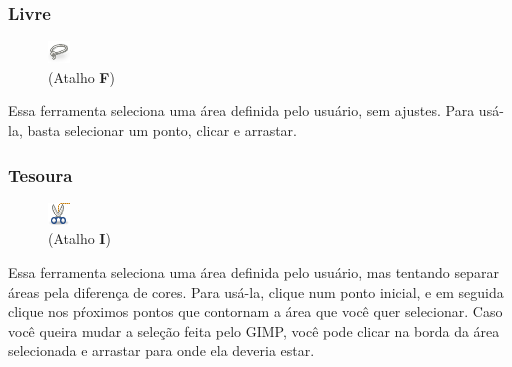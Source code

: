 \documentclass[12pt,onecolumn]{article}
\begin{document}
      \subsubsection{Livre}
      \begin{figure}
        \vspace{-30pt}
        \begin{center}
          \includegraphics{gimp-icons/stock-tool-free-select-22.png} \\
          (Atalho {\bf F})
        \end{center}
        \label{fig:freeselect}
        \vspace{-20pt}
      \end{figure}
      Essa ferramenta seleciona uma área definida pelo usuário, sem ajustes. Para usá-la, basta
      selecionar um ponto, clicar e arrastar.
      
      \subsubsection{Tesoura}
      \begin{figure}
        \begin{center}
          \includegraphics{gimp-icons/stock-tool-iscissors-22.png} \\
          (Atalho {\bf I})
        \end{center}
        \label{fig:scissorsselect}
      \end{figure}
      Essa ferramenta seleciona uma área definida pelo usuário, mas tentando separar áreas pela
      diferença de cores. Para usá-la, clique num ponto inicial, e em seguida clique nos pŕoximos
      pontos que contornam a área que você quer selecionar. Caso você queira mudar a seleção feita
      pelo GIMP, você pode clicar na borda da área selecionada e arrastar para onde ela deveria 
      estar.
\end{document}
